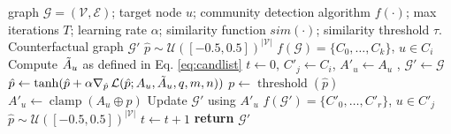 \begin{algorithm}
    \caption{\texttt{\method{}}}\label{alg:pseudocode} 
    \begin{algorithmic}[1]
        \REQUIRE graph $\mathcal{G} = (\mathcal{V}, \mathcal{E})$;
        target node $u$;
        community detection algorithm $f(\cdot)$; max iterations $T$;
        learning rate $\alpha$;
        similarity function $sim(\cdot)$;
        similarity threshold $\tau$.
        \ENSURE Counterfactual graph $\mathcal{G'}$
        \STATE $\hat{p} \sim \mathcal{U}([-0.5,0.5])^{|\mathcal{V}|}$
        \STATE $f(\mathcal{G}) = \{C_0, \ldots, C_k\}$,  $u \in C_i$
        \STATE Compute $\tilde{A}_{u}$ as defined in Eq. \ref{eq:candlist}
        \STATE $t \gets 0$, $C'_j \gets C_i$, $A'_u \gets A_u$ , $\mathcal{G'} \gets \mathcal{G}$
            \STATE $\hat{p} \gets \tanh(\hat{p} + \alpha \nabla_{\hat{p}} \, \mathcal{L}(\hat{p}; A_u, \tilde{A}_{u}, q, m , n))$
            \STATE $p \gets \operatorname{threshold}(\hat{p})$
            \STATE $A'_u \gets \operatorname{clamp}(A_u \oplus p)$
                \STATE Update $\mathcal{G'}$ using $A'_u$
                \STATE $f(\mathcal{G'}) = \{C'_0, \ldots, C'_r\}$,  $u \in C'_j$
            \ENDIF
                \STATE $\hat{p} \sim \mathcal{U}([-0.5,0.5])^{|\mathcal{V}|}$
            \ENDIF
            \STATE $t \gets t+1$
        \ENDWHILE
        \STATE \textbf{return} $\mathcal{G'}$
    \end{algorithmic}
\end{algorithm}



